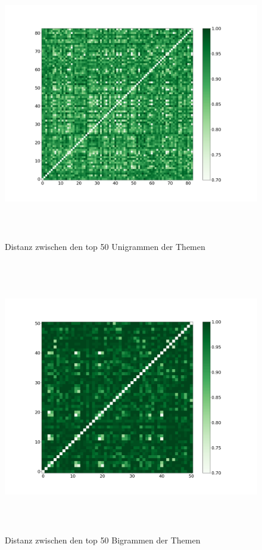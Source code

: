 \begin{figure}[htpb]
	\centering
	\includegraphics[width=\textwidth,height=12cm,keepaspectratio=true]{img/unigram_jaccard_50_green_07.png}
	\caption{
		Distanz zwischen den top 50 Unigrammen der Themen
	}
	\label{fig:Distanz_Unigramme}
\end{figure}

\begin{figure}[htpb]
	\centering
	\includegraphics[width=\textwidth,height=12cm,keepaspectratio=true]{img/bigram_jaccard_50_green_07.png}
	\caption{
		Distanz zwischen den top 50 Bigrammen der Themen
	}
	\label{fig:Distanz_Bigramme}
\end{figure}


